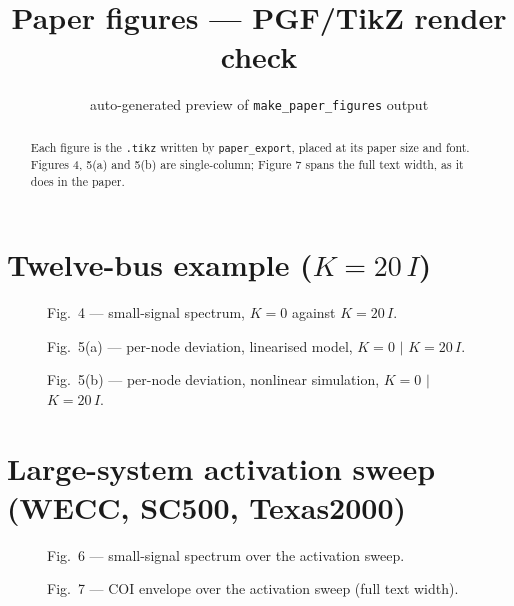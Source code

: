 \documentclass[journal]{IEEEtran}
\newcommand{\figdir}{../figures}
\begin{document}
\title{Paper figures --- PGF/TikZ render check}
\author{auto-generated preview of \texttt{make\_paper\_figures} output}
\maketitle

\begin{abstract}
Each figure is the \texttt{.tikz} written by \texttt{paper\_export}, placed at its
paper size and font. Figures 4, 5(a) and 5(b) are single-column; Figure 7 spans the
full text width, as it does in the paper.
\end{abstract}

\section{Twelve-bus example ($K = 20\,I$)}

\begin{figure}[!t]\centering
  
  \caption{Fig.~4 --- small-signal spectrum, $K=0$ against $K=20\,I$.}
\end{figure}

\begin{figure}[!t]\centering
  
  \caption{Fig.~5(a) --- per-node deviation, linearised model, $K=0$ $|$ $K=20\,I$.}
\end{figure}

\begin{figure}[!t]\centering
  
  \caption{Fig.~5(b) --- per-node deviation, nonlinear simulation, $K=0$ $|$ $K=20\,I$.}
\end{figure}

\section{Large-system activation sweep (WECC, SC500, Texas2000)}

\begin{figure}[!t]\centering
  
  \caption{Fig.~6 --- small-signal spectrum over the activation sweep.}
\end{figure}

\begin{figure}[!t]\centering
  
  \caption{Fig.~7 --- COI envelope over the activation sweep (full text width).}
\end{figure}
\end{document}
